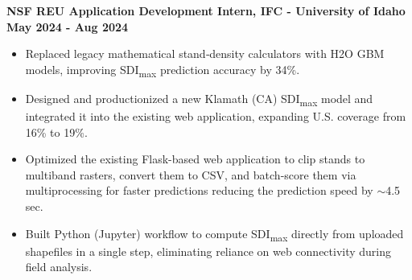 \textbf{NSF REU Application Development Intern, IFC - University of Idaho} \hfill \textbf{May 2024 - Aug 2024}
\begin{itemize}[leftmargin=*, itemsep=1pt]
\item Replaced legacy mathematical stand‑density calculators with H2O GBM models, improving SDI\textsubscript{max} prediction accuracy by 34\%.
\item Designed and productionized a new Klamath (CA) SDI\textsubscript{max} model and integrated it into the existing web application, expanding U.S. coverage from 16\% to 19\%.
\item Optimized the existing Flask-based web application to clip stands to multiband rasters, convert them to CSV, and batch-score them via multiprocessing for faster predictions reducing the prediction speed by \(\sim\)4.5 sec.
\item Built Python (Jupyter) workflow to compute SDI\textsubscript{max} directly from uploaded shapefiles in a single step, eliminating reliance on web connectivity during field analysis.

\end{itemize}